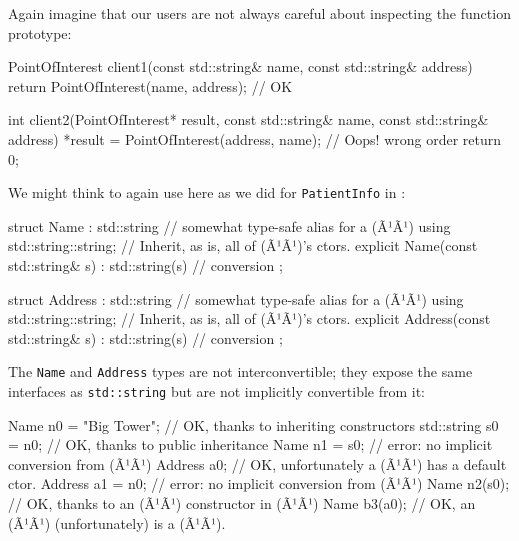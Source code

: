 \noindent Again imagine that our users are not always careful about inspecting the
function prototype:

\begin{emcppslisting}[language=C++]
PointOfInterest client1(const std::string& name, const std::string& address)
{
    return PointOfInterest(name, address);  // OK
}

int client2(PointOfInterest*   result,                                          
            const std::string& name,                                            
            const std::string& address)
{
    *result = PointOfInterest(address, name);  // Oops! wrong order
    return 0;
}
\end{emcppslisting}
    
\noindent We might think to again use  here as we
did for \lstinline!PatientInfo! in : 

\begin{emcppslisting}[language=C++]
struct Name : std::string  // somewhat type-safe alias for a (Ã¹{}Ã¹)
{
    using std::string::string;  // Inherit, as is, all of (Ã¹{}Ã¹)'s ctors.
    explicit Name(const std::string& s) : std::string(s) { }  // conversion
};

struct Address : std::string  // somewhat type-safe alias for a (Ã¹{}Ã¹)
{
    using std::string::string;  // Inherit, as is, all of (Ã¹{}Ã¹)'s ctors.
    explicit Address(const std::string& s) : std::string(s) { }  // conversion
};
\end{emcppslisting}
    
\noindent The \lstinline!Name! and \lstinline!Address! types are not interconvertible; they expose the same interfaces as \lstinline!std::string! but are not
implicitly convertible from it:

\begin{emcppslisting}[language=C++]
Name n0 = "Big Tower";  // OK, thanks to inheriting constructors
std::string s0 = n0;    // OK, thanks to public inheritance
Name n1 = s0;           // error: no implicit conversion from (Ã¹{}Ã¹)
Address a0;             // OK, unfortunately a (Ã¹{}Ã¹) has a default ctor.
Address a1 = n0;        // error: no implicit conversion from (Ã¹{}Ã¹)
Name n2(s0);            // OK, thanks to an (Ã¹{}Ã¹) constructor in (Ã¹{}Ã¹)
Name b3(a0);            // OK, an (Ã¹{}Ã¹) (unfortunately) is a (Ã¹{}Ã¹).
\end{emcppslisting}
    
